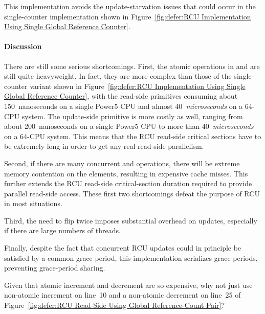 This implementation avoids the update-starvation issues that could
occur in the single-counter implementation shown in
Figure~\ref{fig:defer:RCU Implementation Using Single Global Reference Counter}.

\paragraph{Discussion}

There are still some serious shortcomings.
First, the atomic operations in 
and 
are still quite heavyweight.
In fact, they are more complex than those
of the single-counter variant shown in
Figure~\ref{fig:defer:RCU Implementation Using Single Global Reference Counter},
with the read-side primitives consuming about 150~nanoseconds on a single
Power5 CPU and almost 40~\emph{microseconds} on a 64-CPU system.
The update-side  primitive is more costly as
well, ranging from about 200~nanoseconds on a single Power5 CPU to
more than 40~\emph{microseconds} on a 64-CPU system.
This means that the RCU read-side critical sections
have to be extremely long in order to get any real
read-side parallelism.

Second, if there are many concurrent 
and  operations, there will
be extreme memory contention on the 
elements, resulting in expensive cache misses.
This further extends the RCU read-side critical-section
duration required to provide parallel read-side access.
These first two shortcomings defeat the purpose of RCU in most
situations.

Third, the need to flip  twice imposes substantial
overhead on updates, especially if there are large
numbers of threads.

Finally, despite the fact that concurrent RCU updates could in principle be
satisfied by a common grace period, this implementation
serializes grace periods, preventing grace-period
sharing.

\QuickQuiz{}
	Given that atomic increment and decrement are so expensive,
	why not just use non-atomic increment on line~10 and a
	non-atomic decrement on line~25 of
	Figure~\ref{fig:defer:RCU Read-Side Using Global Reference-Count Pair}?
 \QuickQuizEnd

